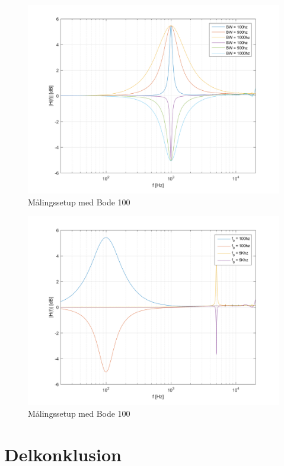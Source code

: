 \begin{figure}[h!]\label{fig:Bandwith_med_hotfix}
	\centering
	\includegraphics[scale = 0.8]{billeder/Bandwidth_Med_hotfix}
	\caption{Målingssetup med Bode 100}
\end{figure}

\begin{figure}[h!]\label{fig:Frekvensplacering_med_hotfix}
	\centering
	\includegraphics[scale = 0.8]{billeder/Frekvensplacering_Med_hotfix}
	\caption{Målingssetup med Bode 100}
\end{figure}

\section{Delkonklusion}




